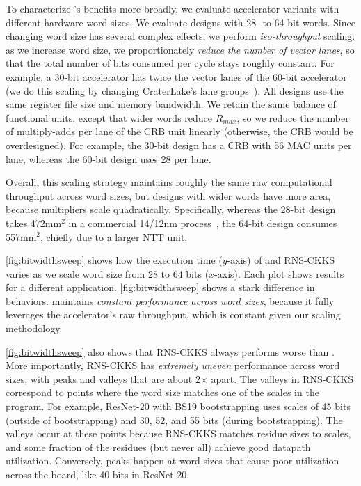 To characterize \name's benefits more broadly, we evaluate accelerator variants with
different hardware word sizes.
We evaluate designs with 28- to 64-bit words.
Since changing word size has several complex effects, we perform
\emph{iso-throughput} scaling: as we increase word size, we proportionately \emph{reduce the
number of vector lanes}, so that the total number of bits consumed per cycle
stays roughly constant.
For example, a 30-bit accelerator has twice the vector lanes of the 60-bit
accelerator (we do this scaling by changing CraterLake's lane
groups~\cite{samardzic:isca22:craterlake}).
All designs use the same register file size and memory bandwidth.
We retain the same balance of functional units, except that wider words reduce
$R_{max}$, so we reduce the number of multiply-adds per lane of the CRB unit
linearly (otherwise, the CRB would be overdesigned).
For example, the 30-bit design has a CRB with 56 MAC units per lane, whereas
the 60-bit design uses 28 per lane.

Overall, this scaling strategy maintains roughly the same raw computational
throughput across word sizes, but designs with wider words have more area, because
multipliers scale quadratically.
Specifically, whereas the 28-bit design takes 472mm$^2$ in a commercial 14/12nm
process~\cite{samardzic:isca22:craterlake}, the 64-bit design consumes
557mm$^2$, chiefly due to a larger NTT unit.

\autoref{fig:bitwidthsweep} shows how the execution time ($y$-axis) of \name and RNS-CKKS varies as
we scale word size from 28 to 64 bits ($x$-axis). Each plot shows results for a different application.
\autoref{fig:bitwidthsweep} shows a stark difference in behaviors.
\name maintains \emph{constant performance across word sizes},
because it fully leverages the accelerator's raw throughput, which is constant
given our scaling methodology.

\autoref{fig:bitwidthsweep} also shows that RNS-CKKS always performs
worse than \name.
More importantly, RNS-CKKS has \emph{extremely uneven} performance across word
sizes, with peaks and valleys that are about 2$\times$ apart.
The valleys in RNS-CKKS correspond to points where the word size matches one of
the scales in the program.
For example, ResNet-20 with BS19 bootstrapping uses scales of 45 bits (outside
of bootstrapping) and 30, 52, and 55 bits (during bootstrapping).
The valleys occur at these points because RNS-CKKS matches residue sizes to
scales, and some fraction of the residues (but never all) achieve good datapath
utilization.
Conversely, peaks happen at word sizes that cause poor utilization across the
board, like 40 bits in ResNet-20.

